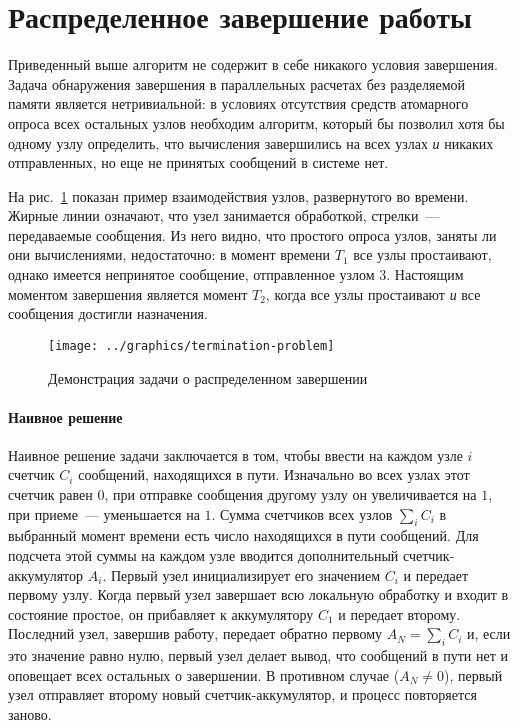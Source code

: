 \section{Распределенное завершение работы}
\label{sec:distributed-termination}

Приведенный выше алгоритм не содержит в себе никакого условия завершения. Задача
обнаружения завершения в параллельных расчетах без разделяемой памяти является
нетривиальной: в условиях отсутствия средств атомарного опроса всех остальных узлов
необходим алгоритм, который бы позволил хотя бы одному узлу определить, что вычисления
завершились на всех узлах \emph{и} никаких отправленных, но еще не принятых сообщений в
системе нет.

На рис.~\ref{fig:termination-problem} показан пример взаимодействия узлов, развернутого во
времени. Жирные линии означают, что узел занимается обработкой, стрелки~--- передаваемые
сообщения. Из него видно, что простого опроса узлов, заняты ли они вычислениями,
недостаточно: в момент времени $T_1$ все узлы простаивают, однако имеется непринятое
сообщение, отправленное узлом 3. Настоящим моментом завершения является момент $T_2$,
когда все узлы простаивают \emph{и} все сообщения достигли назначения.

\begin{figure}[htb]
  \centering
  \texttt{[image: ../graphics/termination-problem]}  
  \caption{Демонстрация задачи о распределенном завершении}
\label{fig:termination-problem}
\end{figure}

\paragraph{Наивное решение}

Наивное решение задачи заключается в том, чтобы ввести на каждом узле $i$ счетчик $C_i$
сообщений, находящихся в пути. Изначально во всех узлах этот счетчик равен $0$, при
отправке сообщения другому узлу он увеличивается на $1$, при приеме~--- уменьшается на
$1$. Сумма счетчиков всех узлов $\sum_iC_i$ в выбранный момент времени есть число
находящихся в пути сообщений. Для подсчета этой суммы на каждом узле вводится
дополнительный счетчик-аккумулятор $A_i$. Первый узел инициализирует его значением $C_i$ и
передает первому узлу. Когда первый узел завершает всю локальную обработку и входит в
состояние простое, он прибавляет к аккумулятору $C_1$ и передает второму\etc. Последний
узел, завершив работу, передает обратно первому $A_N = \sum_iC_i$ и, если это значение
равно нулю, первый узел делает вывод, что сообщений в пути нет и оповещает всех остальных
о завершении. В противном случае ($A_N \neq 0$), первый узел отправляет второму новый
счетчик-аккумулятор, и процесс повторяется заново.

